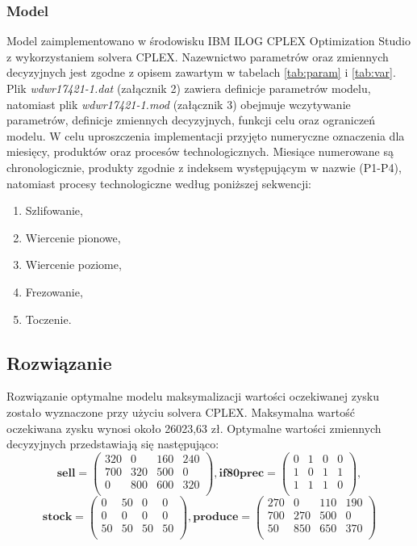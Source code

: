 \documentclass[11pt,a4paper]{article}
\begin{document}
\subsubsection{Model}
Model zaimplementowano w środowisku IBM ILOG CPLEX Optimization Studio z wykorzystaniem solvera CPLEX. Nazewnictwo parametrów oraz zmiennych decyzyjnych jest zgodne z opisem zawartym w tabelach \ref{tab:param} i \ref{tab:var}. Plik \textit{wdwr17421-1.dat} (załącznik 2) zawiera definicje parametrów modelu, natomiast plik \textit{wdwr17421-1.mod} (załącznik 3) obejmuje wczytywanie parametrów, definicje zmiennych decyzyjnych, funkcji celu oraz ograniczeń modelu. W celu uproszczenia implementacji przyjęto numeryczne oznaczenia dla miesięcy, produktów oraz procesów technologicznych. Miesiące numerowane są chronologicznie, produkty zgodnie z indeksem występującym w nazwie (P1-P4), natomiast procesy technologiczne według poniższej sekwencji:
\begin{enumerate}
\item Szlifowanie,
\item Wiercenie pionowe,
\item Wiercenie poziome,
\item Frezowanie,
\item Toczenie.
\end{enumerate}

\subsection{Rozwiązanie}
Rozwiązanie optymalne modelu maksymalizacji wartości oczekiwanej zysku zostało wyznaczone przy użyciu solvera CPLEX. Maksymalna wartość oczekiwana zysku wynosi około 26023,63 zł. Optymalne wartości zmiennych decyzyjnych przedstawiają się następująco:
\begin{displaymath}
\mathbf{sell} = 
 \begin{pmatrix}
  320 & 0 & 160 & 240 \\
  700 & 320 & 500 & 0 \\ 
  0 & 800 & 600 & 320 \\  
 \end{pmatrix},
 \mathbf{if80prec} = 
 \begin{pmatrix}
  0 & 1 & 0 & 0 \\
  1 & 0 & 1 & 1 \\ 
  1 & 1 & 1 & 0 \\  
 \end{pmatrix},
\end{displaymath}
\begin{displaymath}
\mathbf{stock} = 
 \begin{pmatrix}
  0 & 50 & 0 & 0 \\
  0 & 0 & 0 & 0 \\ 
  50 & 50 & 50 & 50 \\  
 \end{pmatrix},
 \mathbf{produce} = 
 \begin{pmatrix}
  270 & 0 & 110 & 190 \\
  700 & 270 & 500 & 0 \\ 
  50 & 850 & 650 & 370 \\  
 \end{pmatrix} 
\end{displaymath}
\end{document}
